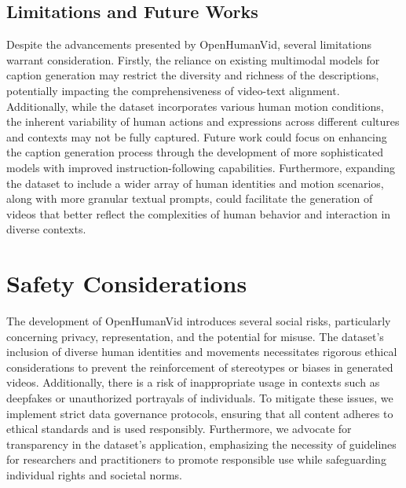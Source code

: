 \documentclass[10pt,twocolumn,letterpaper]{article}
\begin{document}
\subsection{Limitations and Future Works}
Despite the advancements presented by OpenHumanVid, several limitations warrant consideration. 
Firstly, the reliance on existing multimodal models for caption generation may restrict the diversity and richness of the descriptions, potentially impacting the comprehensiveness of video-text alignment. 
Additionally, while the dataset incorporates various human motion conditions, the inherent variability of human actions and expressions across different cultures and contexts may not be fully captured. 
Future work could focus on enhancing the caption generation process through the development of more sophisticated models with improved instruction-following capabilities. 
Furthermore, expanding the dataset to include a wider array of human identities and motion scenarios, along with more granular textual prompts, could facilitate the generation of videos that better reflect the complexities of human behavior and interaction in diverse contexts.

\section{Safety Considerations}
The development of OpenHumanVid introduces several social risks, particularly concerning privacy, representation, and the potential for misuse. The dataset's inclusion of diverse human identities and movements necessitates rigorous ethical considerations to prevent the reinforcement of stereotypes or biases in generated videos. Additionally, there is a risk of inappropriate usage in contexts such as deepfakes or unauthorized portrayals of individuals. To mitigate these issues, we implement strict data governance protocols, ensuring that all content adheres to ethical standards and is used responsibly. Furthermore, we advocate for transparency in the dataset's application, emphasizing the necessity of guidelines for researchers and practitioners to promote responsible use while safeguarding individual rights and societal norms.

{\small


}
% 
\end{document}

